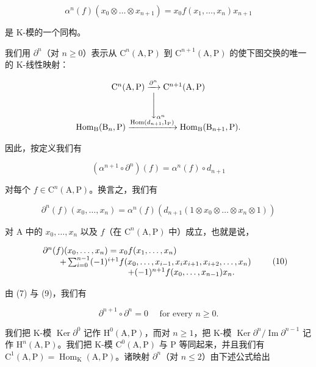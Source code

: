 \[
\alpha^ {n} (f) \left(x _ {0} \otimes \dots \otimes x _ {n + 1}\right) = x _ {0} f (x _ {1}, \ldots , x _ {n}) x _ {n + 1}\tag{8}
\]

是 K-模的一个同构。

我们用 \(\partial^{n}\)（对 \(n \geqslant 0\)）表示从 \(\mathrm{C}^{n}(\mathrm{A},\mathrm{P})\) 到 \(\mathrm{C}^{n+1}(\mathrm{A},\mathrm{P})\) 的使下图交换的唯一的 K-线性映射：

\[
\begin{array}{c} \mathrm{C} ^ {n} (\mathrm{A}, \mathrm{P}) \xrightarrow {\partial^ {n}} \mathrm{C} ^ {n + 1} (\mathrm{A}, \mathrm{P}) \\ \Biggl \downarrow_ {\alpha^ {n}} \\ \mathrm{Hom} _ {\mathrm{B}} (\mathrm{B} _ {n}, \mathrm{P}) \xrightarrow {\mathrm{Hom} (d _ {n + 1} , 1 _ {\mathrm{P}})} \mathrm{Hom} _ {\mathrm{B}} (\mathrm{B} _ {n + 1}, \mathrm{P}). \end{array}
\]

因此，按定义我们有

\[
(\alpha^ {n + 1} \circ \partial^ {n}) (f) = \alpha^ {n} (f) \circ d _ {n + 1}\tag{9}
\]

对每个 \(f \in \mathrm{C}^n(\mathrm{A},\mathrm{P})\)。换言之，我们有

\[
\partial^ {n} (f) \left(x _ {0}, \dots , x _ {n}\right) = \alpha^ {n} (f) \left(d _ {n + 1} \left(1 \otimes x _ {0} \otimes \dots \otimes x _ {n} \otimes 1\right)\right)
\]

对 A 中的 \(x_0, \ldots, x_n\) 以及 \(f\)（在 \(\mathrm{C}^n(\mathrm{A}, \mathrm{P})\) 中）成立，也就是说，

\[
\begin{array}{r l} & {\partial^ {n} (f) (x _ {0}, \ldots , x _ {n}) = x _ {0} f (x _ {1}, \ldots , x _ {n})} \\ & {\qquad + \sum_ {i = 0} ^ {n - 1} (- 1) ^ {i + 1} f (x _ {0}, \ldots , x _ {i - 1}, x _ {i} x _ {i + 1}, x _ {i + 2}, \ldots , x _ {n})} \\ & {\qquad \qquad \qquad \qquad \qquad + (- 1) ^ {n + 1} f (x _ {0}, \ldots , x _ {n - 1}) x _ {n}.} \end{array}\tag{10}
\]

由 (7) 与 (9)，我们有

\[
\partial^ {n + 1} \circ \partial^ {n} = 0 \quad \text {   for   every   } n \geqslant 0.\tag{11}
\]

我们把 K-模 \(\operatorname{Ker} \partial^0\) 记作 \(\mathrm{H}^0(\mathrm{A},\mathrm{P})\)，而对 \(n \geqslant 1\)，把 K-模 \(\operatorname{Ker} \partial^n/\operatorname{Im} \partial^{n-1}\) 记作 \(\mathrm{H}^n(\mathrm{A},\mathrm{P})\)。我们把 K-模 \(\mathrm{C}^0(\mathrm{A},\mathrm{P})\) 与 \(\mathrm{P}\) 等同起来，并且我们有 \(\mathrm{C}^1(\mathrm{A},\mathrm{P}) = \operatorname{Hom}_\mathrm{K}(\mathrm{A},\mathrm{P})\)。诸映射 \(\partial^n\)（对 \(n \leqslant 2\)）由下述公式给出

